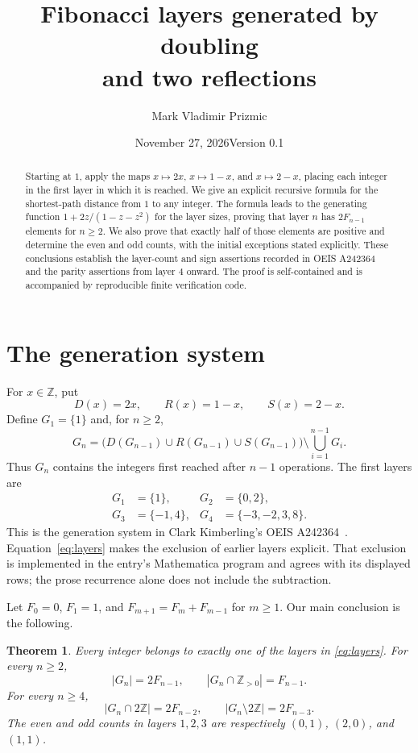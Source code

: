 \documentclass[11pt]{article}
\title{Fibonacci layers generated by doubling\\and two reflections}
\author{Mark Vladimir Prizmic}
\date{November 27, 2026\quad\textnormal{\small Version 0.1}}
\newtheorem{theorem}{Theorem}
\theoremstyle{remark}
\newcommand{\Z}{\mathbb Z}
\begin{document}
\maketitle

\begin{abstract}
Starting at $1$, apply the maps $x\mapsto2x$, $x\mapsto1-x$, and
$x\mapsto2-x$, placing each integer in the first layer in which it is
reached. We give an explicit recursive formula for the shortest-path
distance from $1$ to any integer. The formula leads to the generating
function $1+2z/(1-z-z^2)$ for the layer sizes, proving that layer $n$ has
$2F_{n-1}$ elements for $n\ge2$. We also prove that exactly half of those
elements are positive and determine the even and odd counts, with the
initial exceptions stated explicitly. These conclusions establish the
layer-count and sign assertions recorded in OEIS A242364 and the parity
assertions from layer $4$ onward. The proof is self-contained and is
accompanied by reproducible finite verification code.
\end{abstract}

\section{The generation system}

For $x\in\Z$, put
\[
D(x)=2x,\qquad R(x)=1-x,\qquad S(x)=2-x.
\]
Define $G_1=\{1\}$ and, for $n\ge2$,
\begin{equation}\label{eq:layers}
G_n=\bigl(D(G_{n-1})\cup R(G_{n-1})\cup S(G_{n-1})\bigr)
       \setminus\bigcup_{i=1}^{n-1}G_i.
\end{equation}
Thus $G_n$ contains the integers first reached after $n-1$ operations.
The first layers are
\[
\begin{aligned}
G_1&=\{1\},&G_2&=\{0,2\},\\
G_3&=\{-1,4\},&G_4&=\{-3,-2,3,8\}.
\end{aligned}
\]
This is the generation system in Clark Kimberling's OEIS
A242364~\cite{oeis}. Equation~\eqref{eq:layers} makes the exclusion of
earlier layers explicit. That exclusion is implemented in the entry's
Mathematica program and agrees with its displayed rows; the prose
recurrence alone does not include the subtraction.

Let $F_0=0$, $F_1=1$, and $F_{m+1}=F_m+F_{m-1}$ for $m\ge1$.
Our main conclusion is the following.

\begin{theorem}\label{thm:main}
Every integer belongs to exactly one of the layers in
\eqref{eq:layers}. For every $n\ge2$,
\begin{equation}\label{eq:main-count}
|G_n|=2F_{n-1},\qquad
|G_n\cap\Z_{>0}|=F_{n-1}.
\end{equation}
For every $n\ge4$,
\begin{equation}\label{eq:main-parity}
|G_n\cap2\Z|=2F_{n-2},\qquad
|G_n\setminus2\Z|=2F_{n-3}.
\end{equation}
The even and odd counts in layers $1,2,3$ are respectively
$(0,1)$, $(2,0)$, and $(1,1)$.
\end{theorem}
\end{document}
